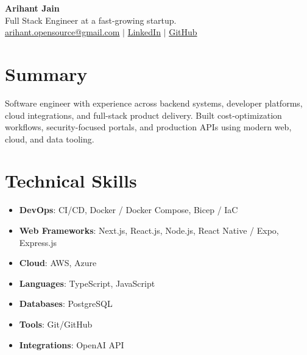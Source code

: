 \documentclass[11pt,a4paper]{article}
\begin{document}
\begin{center}
{\LARGE \textbf{Arihant Jain}}
\\ Full Stack Engineer at a fast-growing startup.
\\ \href{mailto:arihant.opensource@gmail.com}{arihant.opensource@gmail.com} $\mid$ \href{https://linkedin.com/in/arihantjain1208}{LinkedIn} $\mid$ \href{https://github.com/Arihant1208}{GitHub}
\end{center}

\section{Summary}
Software engineer with experience across backend systems, developer platforms, cloud integrations, and full-stack product delivery. Built cost-optimization workflows, security-focused portals, and production APIs using modern web, cloud, and data tooling.

\section{Technical Skills}
\begin{itemize}
  \item \textbf{DevOps}: CI/CD, Docker / Docker Compose, Bicep / IaC
  \item \textbf{Web Frameworks}: Next.js, React.js, Node.js, React Native / Expo, Express.js
  \item \textbf{Cloud}: AWS, Azure
  \item \textbf{Languages}: TypeScript, JavaScript
  \item \textbf{Databases}: PostgreSQL
  \item \textbf{Tools}: Git/GitHub
  \item \textbf{Integrations}: OpenAI API
\end{itemize}
\end{document}
